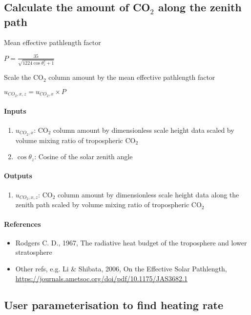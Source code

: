 \subsection{Calculate the amount of CO$_2$ along the zenith path}

   Mean effective pathlength factor

   \noindent $P = \frac{35}{\sqrt{1224\cos\theta_z^2 + 1}}$

   \noindent Scale the CO$_2$ column amount by the mean effective pathlength factor

   \noindent $u_{CO_2, x, z} = u_{CO_2, x} \times P$

   \paragraph{Inputs}
   \begin{enumerate}
   \item $u_{CO_2, x}$: CO$_2$ column amount by dimensionless scale height data scaled by volume mixing ratio of tropospheric CO$_2$
   \item $\cos\theta_{z}$: Cosine of the solar zenith angle
   \end{enumerate}

   \paragraph{Outputs}
   \begin{enumerate}
   \item $u_{CO_2, x, z}$: CO$_2$ column amount by dimensionless scale height data along the zenith path scaled by volume mixing ratio of tropospheric CO$_2$
   \end{enumerate}

   \paragraph{References}
   \begin{itemize}
   \item Rodgers C. D., 1967, The radiative heat budget of the troposphere and lower stratosphere
   \item Other refs, e.g. Li \& Shibata, 2006, On the Effective Solar Pathlength, \\ \url{https://journals.ametsoc.org/doi/pdf/10.1175/JAS3682.1}
   \end{itemize}

\subsection{User parameterisation to find heating rate}

